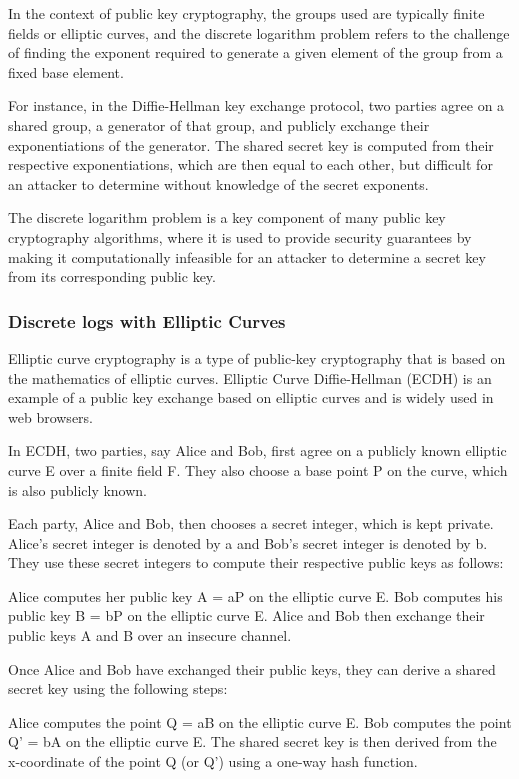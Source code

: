 \documentclass{article}
\begin{document}
In the context of public key cryptography, the groups used are typically finite fields or elliptic curves, and the discrete logarithm problem refers to the challenge of finding the exponent required to generate a given element of the group from a fixed base element.

For instance, in the Diffie-Hellman key exchange protocol, two parties agree on a shared group, a generator of that group, and publicly exchange their exponentiations of the generator. The shared secret key is computed from their respective exponentiations, which are then equal to each other, but difficult for an attacker to determine without knowledge of the secret exponents.

The discrete logarithm problem is a key component of many public key cryptography algorithms, where it is used to provide security guarantees by making it computationally infeasible for an attacker to determine a secret key from its corresponding public key.

\subsubsection{Discrete logs with Elliptic Curves}
Elliptic curve cryptography is a type of public-key cryptography that is based on the mathematics of elliptic curves. Elliptic Curve Diffie-Hellman (ECDH) is an example of a public key exchange based on elliptic curves and is widely used in web browsers.

In ECDH, two parties, say Alice and Bob, first agree on a publicly known elliptic curve E over a finite field F. They also choose a base point P on the curve, which is also publicly known.

Each party, Alice and Bob, then chooses a secret integer, which is kept private. Alice's secret integer is denoted by a and Bob's secret integer is denoted by b. They use these secret integers to compute their respective public keys as follows:

Alice computes her public key A = aP on the elliptic curve E.
Bob computes his public key B = bP on the elliptic curve E.
Alice and Bob then exchange their public keys A and B over an insecure channel.

Once Alice and Bob have exchanged their public keys, they can derive a shared secret key using the following steps:

Alice computes the point Q = aB on the elliptic curve E.
Bob computes the point Q' = bA on the elliptic curve E.
The shared secret key is then derived from the x-coordinate of the point Q (or Q') using a one-way hash function.
\end{document}
